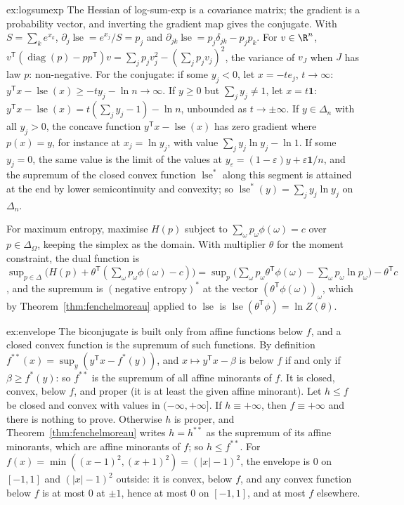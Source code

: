 \begin{solution}{ex:logsumexp}
\idea The Hessian of log-sum-exp is a covariance matrix; the gradient is a probability vector, and inverting the gradient map gives the conjugate.
\writeup With $S=\sum_ke^{x_k}$, $\partial_j\operatorname{lse}=e^{x_j}/S=p_j$ and $\partial_{jk}\operatorname{lse}=p_j\delta_{jk}-p_jp_k$. For $v\in\R^n$,
$v^{\mathsf T}(\operatorname{diag}(p)-pp^{\mathsf T})v=\sum_jp_jv_j^2-(\sum_jp_jv_j)^2$, the variance of $v_J$ when $J$ has law $p$: non-negative. For the conjugate: if some $y_j<0$, let $x=-te_j$,
$t\to\infty$: $y^{\mathsf T}x-\operatorname{lse}(x)\ge-ty_j-\ln n\to\infty$. If $y\ge0$ but $\sum_jy_j\ne1$, let $x=t\mathbf1$: $y^{\mathsf T}x-\operatorname{lse}(x)=t(\sum_jy_j-1)-\ln n$, unbounded as
$t\to\pm\infty$. If $y\in\Delta_n$ with all $y_j>0$, the concave function $y^{\mathsf T}x-\operatorname{lse}(x)$ has zero gradient where $p(x)=y$, for instance at $x_j=\ln y_j$, with value
$\sum_jy_j\ln y_j-\ln1$. If some $y_j=0$, the same value is the limit of the values at $y_\varepsilon=(1-\varepsilon)y+\varepsilon\mathbf1/n$, and the supremum of the closed convex function $\operatorname{lse}^*$
along this segment is attained at the end by lower semicontinuity and convexity; so $\operatorname{lse}^*(y)=\sum_jy_j\ln y_j$ on $\Delta_n$.

For maximum entropy, maximise $H(p)$ subject to $\sum_\omega p_\omega\phi(\omega)=c$ over $p\in\Delta_\Omega$, keeping the simplex as the domain. With multiplier $\theta$ for the moment constraint,
the dual function is $\sup_{p\in\Delta}\bigl(H(p)+\theta^{\mathsf T}(\sum_\omega p_\omega\phi(\omega)-c)\bigr)=\sup_p\bigl(\sum_\omega p_\omega\theta^{\mathsf T}\phi(\omega)-\sum_\omega p_\omega\ln p_\omega\bigr)-\theta^{\mathsf T}c$, and the
supremum is $(\text{negative entropy})^*$ at the vector $(\theta^{\mathsf T}\phi(\omega))_\omega$, which by Theorem~\ref{thm:fenchelmoreau} applied to $\operatorname{lse}$ is $\operatorname{lse}(\theta^{\mathsf T}\phi)=\ln Z(\theta)$.
\end{solution}

\begin{solution}{ex:envelope}
\idea The biconjugate is built only from affine functions below $f$, and a closed convex function is the supremum of such functions.
\writeup By definition $f^{**}(x)=\sup_y(y^{\mathsf T}x-f^*(y))$, and $x\mapsto y^{\mathsf T}x-\beta$ is below $f$ if and only if $\beta\ge f^*(y)$: so $f^{**}$ is the supremum of all affine minorants of $f$.
It is closed, convex, below $f$, and proper (it is at least the given affine minorant). Let $h\le f$ be closed and convex with values in $(-\infty,+\infty]$. If $h\equiv+\infty$, then $f\equiv+\infty$ and there is nothing to prove. Otherwise $h$ is proper, and
Theorem~\ref{thm:fenchelmoreau} writes $h=h^{**}$ as the supremum of its affine minorants, which are affine minorants of $f$; so $h\le f^{**}$. For $f(x)=\min((x-1)^2,(x+1)^2)=(|x|-1)^2$, the envelope is $0$ on $[-1,1]$ and $(|x|-1)^2$ outside:
it is convex, below $f$, and any convex function below $f$ is at most $0$ at $\pm1$, hence at most $0$ on $[-1,1]$, and at most $f$ elsewhere.
\end{solution}

